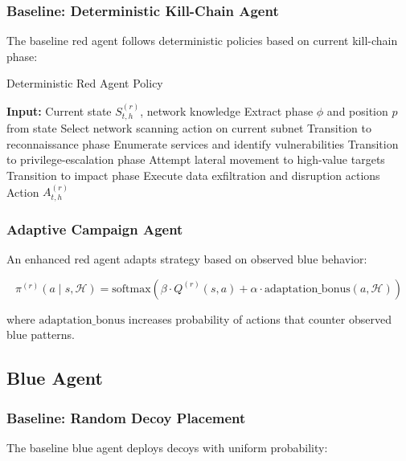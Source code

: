 \documentclass[11pt]{article}
\newcounter{phase}[algorithm]
\theoremstyle{definition}
\theoremstyle{plain}
\newcommand{\MC}[1]{\mathcal{#1}}
\begin{document}
\subsubsection{Baseline: Deterministic Kill-Chain Agent}
The baseline red agent follows deterministic policies based on current kill-chain phase:

\begin{algorithm}
\caption{Deterministic Red Agent Policy}
\begin{algorithmic}[1]
\STATE \textbf{Input:} Current state $S_{t,h}^{(r)}$, network knowledge
\STATE Extract phase $\phi$ and position $p$ from state
    \STATE Select network scanning action on current subnet
        \STATE Transition to reconnaissance phase
    \ENDIF
{}
    \STATE Enumerate services and identify vulnerabilities
        \STATE Transition to privilege-escalation phase
    \ENDIF
{}
    \STATE Attempt lateral movement to high-value targets
        \STATE Transition to impact phase
    \ENDIF
{}
    \STATE Execute data exfiltration and disruption actions
\ENDIF
\RETURN Action $A_{t,h}^{(r)}$
\end{algorithmic}
\end{algorithm}

\subsubsection{Adaptive Campaign Agent}
An enhanced red agent adapts strategy based on observed blue behavior:

\begin{equation}
\pi^{(r)}(a \mid s, \MC{H}) = \text{softmax}(\beta \cdot Q^{(r)}(s, a) + \alpha \cdot \text{adaptation\_bonus}(a, \MC{H}))
\end{equation}

where $\text{adaptation\_bonus}$ increases probability of actions that counter observed blue patterns.

\subsection{Blue Agent}

\subsubsection{Baseline: Random Decoy Placement}
The baseline blue agent deploys decoys with uniform probability:
\end{document}
